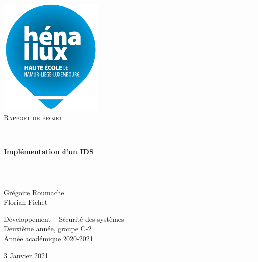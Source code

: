 \documentclass[a4paper]{article}
\newcommand{\HRule}{\rule{\linewidth}{0.5mm}}
\begin{document}
\begin{titlepage}
    \begin{sffamily}
        \begin{center}

            \includegraphics[width=5cm]{images/LogoHenallux.PNG}~\\[1.5cm]
            \textsc{\Large Rapport de projet}\\[1.5cm]

            \HRule \\[0.4cm]
            { \huge \bfseries Implémentation d'un IDS \\[0.4cm] }
            \HRule \\[2cm]

            \begin{minipage}{0.4\textwidth}
                \begin{flushleft} \large
                    Grégoire Roumache\\
                    Florian Fichet\\
                \end{flushleft}
            \end{minipage}
            \begin{minipage}{0.55\textwidth}
                \begin{flushright} \large
                    Développement -- Sécurité des systèmes\\
                    Deuxième année, groupe C-2 \\
                    Année académique 2020-2021\\
                \end{flushright}
            \end{minipage}
            \vfill

            {\large 3 Janvier 2021}

        \end{center}
    \end{sffamily}
\end{titlepage}
\end{document}
